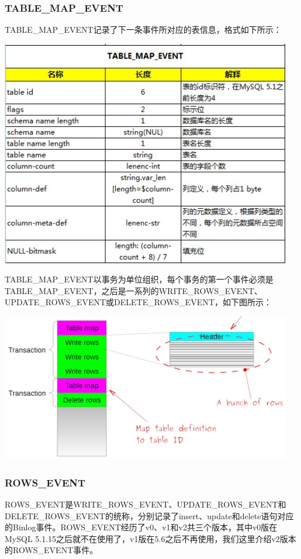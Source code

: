 \documentclass[a4paper, titlepage, 10pt, bookmark]{article}
\begin{document}
\subsubsection{TABLE\_MAP\_EVENT}
TABLE\_MAP\_EVENT记录了下一条事件所对应的表信息，格式如下所示：
\begin{center}
\includegraphics[width=5in]{023.jpg}
\end{center}

TABLE\_MAP\_EVENT以事务为单位组织，每个事务的第一个事件必须是TABLE\_MAP\_EVENT，之后是一系列的WRITE\_ROWS\_EVENT、UPDATE\_ROWS\_EVENT或DELETE\_ROWS\_EVENT，如下图所示：
\begin{center}
\includegraphics[width=5in]{024.jpg}
\end{center}

\subsubsection{ROWS\_EVENT}
ROWS\_EVENT是WRITE\_ROWS\_EVENT、UPDATE\_ROWS\_EVENT和DELETE\_ROWS\_EVENT的统称，分别记录了insert、update和delete语句对应的Binlog事件。ROWS\_EVENT经历了v0、v1和v2共三个版本，其中v0版在MySQL 5.1.15之后就不在使用了，v1版在5.6之后不再使用，我们这里介绍v2版本的ROWS\_EVENT事件。\\
\end{document}
